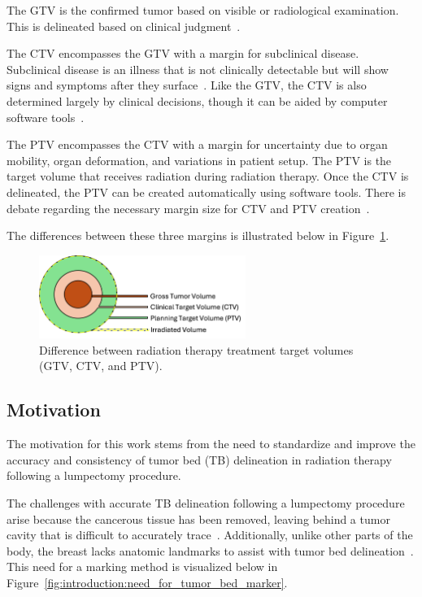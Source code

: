 The GTV is the confirmed tumor based on visible or radiological examination. This is delineated based on clinical judgment~\cite{RefWorks:RefID:190-antolakplanning}.

The CTV encompasses the GTV with a margin for subclinical disease. Subclinical disease is an illness that is not clinically detectable but will show signs and symptoms after they surface~\cite{RefWorks:RefID:373-stöpplermedical}. Like the GTV, the CTV is also determined largely by clinical decisions, though it can be aided by computer software tools~\cite{RefWorks:RefID:190-antolakplanning}.

The PTV encompasses the CTV with a margin for uncertainty due to organ mobility, organ deformation, and variations in patient setup. The PTV is the target volume that receives radiation during radiation therapy. Once the CTV is delineated, the PTV can be created automatically using software tools. There is debate regarding the necessary margin size for CTV and PTV creation~\cite{RefWorks:RefID:190-antolakplanning}.

The differences between these three margins is illustrated below in Figure~\ref{fig:introduction:treatment_target_volumes_comparison}.
\begin{figure}[h!]
        \centering
        \includegraphics[width=0.6\textwidth]{../figs/introduction/treatment_target_volumes.png}
        \caption{Difference between radiation therapy treatment target volumes (GTV, CTV, and PTV)\cite{RefWorks:RefID:370-einsteinisaac}.}
        \label{fig:introduction:treatment_target_volumes_comparison}
\end{figure}


\subsection{Motivation\label{sec:introduction:motivation}}
The motivation for this work stems from the need to standardize and improve the accuracy and consistency of tumor bed (TB) delineation in radiation therapy following a lumpectomy procedure.

The challenges with accurate TB delineation following a lumpectomy procedure arise because the cancerous tissue has been removed, leaving behind a tumor cavity that is difficult to accurately trace~\cite{RefWorks:RefID:25-acree2022review}. Additionally, unlike other parts of the body, the breast lacks anatomic landmarks to assist with tumor bed delineation~\cite{RefWorks:RefID:344-mitchell2019adaptable}. This need for a marking method is visualized below in Figure~\ref{fig:introduction:need_for_tumor_bed_marker}.

